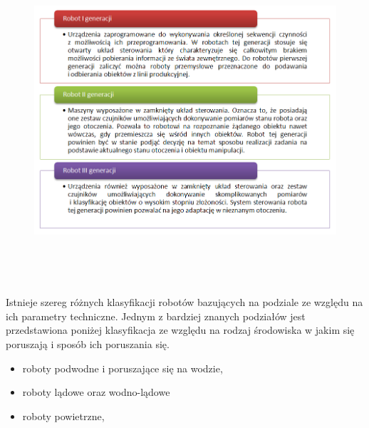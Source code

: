\begin{figure}[hb]
 \centering
 \includegraphics[height=120mm]{../images/ch01/robot_generations.png}
 \label{fig:RobotsGenerations}
\end{figure}

Istnieje szereg różnych klasyfikacji robotów bazujących na podziale ze względu
na ich parametry techniczne. Jednym z bardziej znanych podziałów jest
przedstawiona poniżej klasyfikacja ze względu na rodzaj środowiska w jakim się
poruszają i sposób ich poruszania się.
\begin{itemize}
  \item roboty podwodne i poruszające się na wodzie,
  \item roboty lądowe oraz wodno-lądowe
  \item roboty powietrzne,
\end{itemize}

